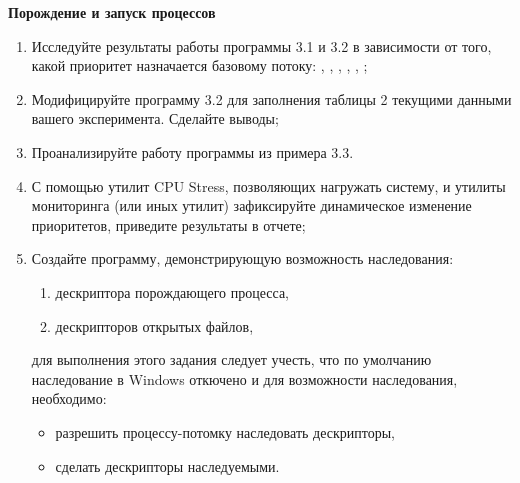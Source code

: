 \renewcommand{\labelenumii}{\theenumii}
\renewcommand{\theenumii}{\theenumi.\arabic{enumii}.}

\textbf{Порождение и запуск процессов}

\begin{enumerate}
	\item Исследуйте результаты работы программы 3.1 и 3.2 в зависимости от того, какой приоритет назначается базовому потоку: , , , , , ;
	\item Модифицируйте программу 3.2 для заполнения таблицы 2 текущими данными вашего эксперимента. Сделайте выводы;
	\item Проанализируйте работу программы из примера 3.3.
	\item С помощью утилит CPU Stress, позволяющих нагружать систему, и утилиты мониторинга  (или иных утилит) зафиксируйте динамическое изменение приоритетов, приведите результаты в отчете;
	\item Создайте программу, демонстрирующую возможность наследования:
		\begin{enumerate}
			\item дескриптора порождающего процесса,
			\item дескрипторов открытых файлов,
		\end{enumerate}
	для выполнения этого задания следует учесть, что по умолчанию наследование в Windows откючено и для возможности наследования, необходимо:
		\begin{itemize}
			\item разрешить процессу-потомку наследовать дескрипторы,
			\item сделать дескрипторы наследуемыми.
		\end{itemize}
\end{enumerate}